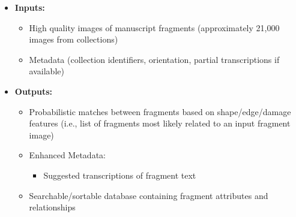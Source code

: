 \documentclass{article}
\begin{document}
\begin{itemize}
  \item \textbf{Inputs:}
    \begin{itemize}
      \item High quality images of manuscript fragments (approximately 21{,}000 images from collections)
      \item Metadata (collection identifiers, orientation, partial transcriptions if available)
    \end{itemize}

  \item \textbf{Outputs:}
    \begin{itemize}
      \item Probabilistic matches between fragments based on shape/edge/damage features (i.e., list of fragments most likely related to an input fragment image)
      \item Enhanced Metadata:
        \begin{itemize}
          \item Suggested transcriptions of fragment text
        \end{itemize}
      \item Searchable/sortable database containing fragment attributes and relationships
    \end{itemize}
\end{itemize}

\end{document}
